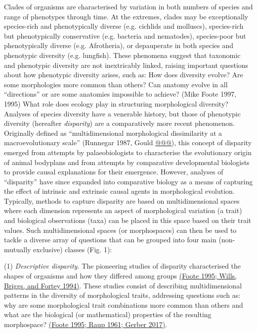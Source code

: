 Clades of organisms are characterised by variation in both numbers of species and range of phenotypes through time.
At the extremes, clades may be exceptionally species-rich and phenotypically diverse (e.g. cichlids and molluscs), species-rich but phenotypically conservative (e.g. bacteria and nematodes), species-poor but phenotypically diverse (e.g. Afrotheria), or depauperate in both species and phenotypic diversity (e.g. lungfish).
These phenomena suggest that taxonomic and phenotypic diversity are not inextricably linked, raising important questions about how phenotypic diversity arises, such as:
How does diversity evolve?
Are some morphologies more common than others?
Can anatomy evolve in all ``directions'' or are some anatomies impossible to achieve? (Mike Foote 1997, 1995)
What role does ecology play in structuring morphological diversity?
Analyses of species diversity have a venerable history, but those of phenotypic diversity (hereafter \emph{disparity}) are a comparatively more recent phenomenon. Originally defined as ``multidimensional morphological dissimilarity at a macroevolutionary scale'' (Runnegar 1987, Gould \href{https://paperpile.com/c/sTGYvp/Uns3}{@@@}),
 this concept of disparity emerged from attempts by palaeobiologists to characterise the evolutionary origin of animal bodyplans and from attempts by comparative developmental biologists to provide causal explanations for their emergence.
However, analyses of ``disparity'' have since expanded into comparative biology as a means of capturing the effect of intrinsic and extrinsic causal agents in morphological evolution.
Typically, methods to capture disparity are based on multidimensional spaces where each dimension represents an aspect of morphological variation (a trait) and biological observations (taxa) can be placed in this space based on their trait values.
Such multidimensional spaces (or morphospaces) can then be used to tackle a diverse array of questions that can be grouped into four main (non-mutually exclusive) classes (Fig. 1):

(1) \emph{Descriptive disparity.} The pioneering studies of disparity characterised the shapes of organisms and how they differed among groups \href{https://paperpile.com/c/sTGYvp/fTJ3+eZ3F}{(Foote 1995; Wills, Briggs, and Fortey 1994)}.
These studies consist of describing multidimensional patterns in the diversity of morphological traits, addressing questions such as: why are some morphological trait combinations more common than others and what are the biological (or mathematical) properties of the resulting morphospace? \href{https://paperpile.com/c/sTGYvp/fTJ3+I0Ic+QVvv}{(Foote 1995; Raup 1961; Gerber 2017)}.

